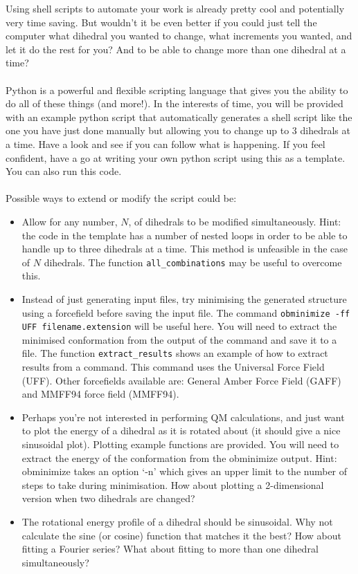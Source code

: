 \documentclass{article}
\begin{document}
Using shell scripts to automate your work is already pretty cool and potentially very time saving. But wouldn't it be even better if you could just tell the computer what dihedral you wanted to change, what increments you wanted, and let it do the rest for you? And to be able to change more than one dihedral at a time?\\
\\
\noindent
Python is a powerful and flexible scripting language that gives you the ability to do all of these things (and more!). In the interests of time, you will be provided with an example python script that automatically generates a shell script like the one you have just done manually but allowing you to change up to 3 dihedrals at a time. Have a look and see if you can follow what is happening. If you feel confident, have a go at writing your own python script using this as a template. You can also run this code.\\
\\
\noindent
Possible ways to extend or modify the script could be:
\begin{itemize}
\item Allow for any number, $N$, of dihedrals to be modified simultaneously. Hint: the code in the template has a number of nested loops in order to be able to handle up to three dihedrals at a time. This method is unfeasible in the case of $N$ dihedrals. The function \texttt{all\_combinations} may be useful to overcome this.
\item Instead of just generating input files, try minimising the generated structure using a forcefield before saving the input file. The command \texttt{obminimize -ff UFF filename.extension} will be useful here. You will need to extract the minimised conformation from the output of the command and save it to a file. The function \texttt{extract\_results} shows an example of how to extract results from a command. This command uses the Universal Force Field (UFF). Other forcefields available are: General Amber Force Field (GAFF) and MMFF94 force field (MMFF94).
\item Perhaps you're not interested in performing QM calculations, and just want to plot the energy of a dihedral as it is rotated about (it should give a nice sinusoidal plot). Plotting example functions are provided. You will need to extract the energy of the conformation from the obminimize output. Hint: obminimize takes an option `-n' which gives an upper limit to the number of steps to take during minimisation. How about plotting a 2-dimensional version when two dihedrals are changed?
\item The rotational energy profile of a dihedral should be sinusoidal. Why not calculate the sine (or cosine) function that matches it the best? How about fitting a Fourier series? What about fitting to more than one dihedral simultaneously?
\end{itemize}
\end{document}
